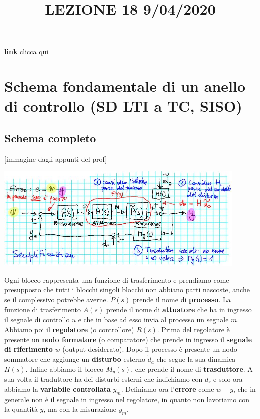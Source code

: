 \title{LEZIONE 18 9/04/2020}\newline
\textbf{link} \href{https://web.microsoftstream.com/video/a6351498-1edd-4ec9-b134-3b5fd7a9a3ee?list=user&userId=faa91214-a6f5-40d7-8875-253fd49b8ce1}{clicca qui}
\section{Schema fondamentale di un anello di controllo (SD LTI a TC, SISO)}
\subsection{Schema completo}
[immagine dagli appunti del prof]
\begin{center}
    \includegraphics[height=5cm]{../lezione18/img1.JPG}
\end{center}
Ogni blocco rappresenta una funzione di trasferimento e prendiamo come presupposto che tutti i blocchi singoli blocchi non abbiano parti nascoste, anche se il complessivo potrebbe averne.\newline
\newline
$\tilde{P}(s)$ prende il nome di \textbf{processo}. La funzione di trasferimento $A(s)$ prende il nome di \textbf{attuatore} che ha in ingresso il segnale di controllo $u$ e che in base ad esso invia al processo un segnale $m$.\newline
\newline
Abbiamo poi il \textbf{regolatore} (o controllore) $R(s)$. Prima del regolatore è presente un \textbf{nodo formatore} (o comparatore) che prende in ingresso il \textbf{segnale di riferimento} $w$ (output desiderato).\newline
\newline
Dopo il processo è presente un nodo sommatore che aggiunge un \textbf{disturbo} esterno $\tilde{d}_a$ che segue la sua dinamica $H(s)$.\newline
\newline
Infine abbiamo il blocco $M_y(s)$, che prende il nome di \textbf{trasduttore}. A sua volta il traduttore ha dei disturbi esterni che indichiamo con $d_r$ e solo ora abbiamo la \textbf{variabile controllata} $y_m$.\newline
\newline
Definiamo ora l'\textbf{errore} come $w-y$, che in generale non è il segnale in ingresso nel regolatore, in quanto non lavoriamo con la quantità $y$, ma con la misurazione $y_m$.
